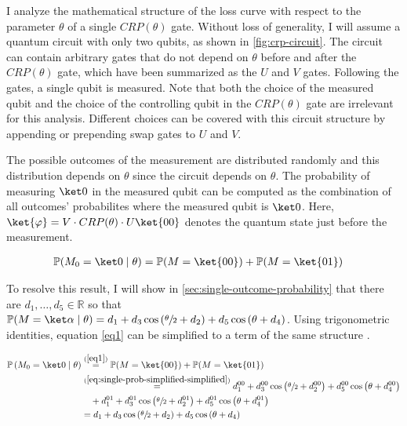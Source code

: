 I analyze the mathematical structure of the loss curve with respect to the
parameter $\theta$ of a single $CRP(\theta)$ gate.
Without loss of generality, I will assume a quantum circuit with only two
qubits, as shown in \autoref{fig:crp-circuit}.
The circuit can contain arbitrary gates that do not depend on $\theta$ before
and after the $CRP(\theta)$ gate, which have been summarized as the $U$ and $V$
gates.
Following the gates, a single qubit is measured.
Note that both the choice of the measured qubit and the choice of the
controlling qubit in the $CRP(\theta)$ gate are irrelevant for this analysis.
Different choices can be covered with this circuit structure by appending or
prepending swap gates to $U$ and $V$.

The possible outcomes of the measurement are distributed randomly and this
distribution depends on $\theta$ since the circuit depends on $\theta$.
The probability of measuring $\ket 0$ in the measured qubit can be computed as
the combination of all outcomes' probabilites where the measured qubit is
$\ket 0$.
Here, $\ket{\varphi} = V \cdot CRP(\theta) \cdot U\ket{00}$ denotes the
quantum state just before the measurement.

\begin{equation}
    \label{eq1}
    \begin{split}
        \mathbb{P}(M_0 = \ket 0 \mid \theta)
            &= \mathbb{P}(M = \ket{00}) + \mathbb{P}(M = \ket{01})
    \end{split}
\end{equation}

To resolve this result, I will show in \autoref{sec:single-outcome-probability}
that there are $d_1, \dots, d_5 \in \mathbb R$ so that
$\mathbb P(M = \ket\alpha \mid \theta) = d_1 + d_3 \cos\left(\sfrac\theta2 + d_2\right) + d_5 \cos\left(\theta + d_4\right)$.
Using trigonometric identities, equation \ref{eq1} can be simplified to a term
of the same structure \cite{bronstejn_taschenbuch_2016}.

\begin{equation}
    \label{eq:total-result-probability}
    \begin{split}
        \mathbb P\left(M_0 = \ket 0 \mid \theta\right)
            &\stackrel{(\ref{eq1})}=
                \mathbb{P}(M = \ket{00}) + \mathbb{P}(M = \ket{01}) \\
            &\stackrel{(\ref{eq:single-prob-simplified-simplified})}=
                d_1^{00} + d_3^{00} \cos\left(\sfrac\theta2 + d_2^{00}\right) + d_5^{00} \cos\left(\theta + d_4^{00}\right) \\
                &\quad + d_1^{01} + d_3^{01} \cos\left(\sfrac\theta2 + d_2^{01}\right) + d_5^{01} \cos\left(\theta + d_4^{01}\right) \\
            &= d_1 + d_3 \cos\left(\sfrac\theta2 + d_2\right) + d_5 \cos\left(\theta + d_4\right)
    \end{split}
\end{equation}

